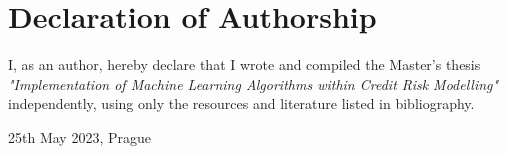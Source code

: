 \vfill

\vglue 14cm

\section*{Declaration of Authorship}
I, as an author, hereby declare that I wrote and compiled the Master's thesis {\it{"Implementation of Machine Learning Algorithms within Credit Risk Modelling"}} independently, using only the resources and literature listed in bibliography.

\bigskip 

\vspace{0.5cm}


\begin{flushleft}
25th May 2023, Prague 
\end{flushleft}
\vspace{-0.5cm}
\begin{flushright}
\AuthorDP
\end{flushright}

